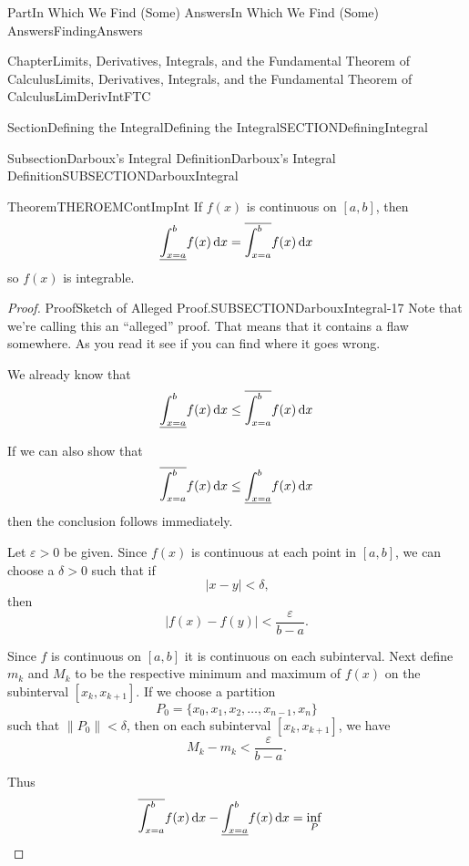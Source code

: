 \documentclass[oneside,10pt,]{book}
\numberwithin{equation}{part}
\newcommand{\norm}[1]{\left\|#1\right\|}
\newcommand{\dx}[1]{\,{\rm d}#1}
\newcommand{\eps}{\varepsilon}
\newcommand{\lt}{<}
\newcommand{\gt}{>}
\newcommand{\amp}{&}
\begin{document}
\begin{partptx}{Part}{In Which We Find (Some) Answers}{}{In Which We Find (Some) Answers}{}{}{FindingAnswers}
\begin{chapterptx}{Chapter}{Limits, Derivatives, Integrals, and the Fundamental Theorem of Calculus}{}{Limits, Derivatives, Integrals, and the Fundamental Theorem of Calculus}{}{}{LimDerivIntFTC}
\begin{sectionptx}{Section}{Defining the Integral}{}{Defining the Integral}{}{}{SECTIONDefiningIntegral}
\begin{subsectionptx}{Subsection}{Darboux's Integral Definition}{}{Darboux's Integral Definition}{}{}{SUBSECTIONDarbouxIntegral}
\begin{theorem}{Theorem}{}{}{THEROEMContImpInt}
If \(f\left(x\right)\) is continuous on \([a,b]\), then%
\begin{equation*}
\underline{\int^b_{x=a}}{f(x)}\dx{x}=\overline{\int^{b}_{x=a}}{f(x)\dx{x}}
\end{equation*}
so \(f(x)\) is integrable.%
\end{theorem}
\begin{proof}{Proof}{Sketch of Alleged Proof.}{SUBSECTIONDarbouxIntegral-17}
Note that we're calling this an ``alleged'' proof. That means that it contains a flaw somewhere. As you read it see if you can find where it goes wrong.%
\par
We already know that%
\begin{equation*}
\underline{\int^b_{x=a}}{f(x)}\dx{x}\le
\overline{\int^{b}_{x=a}}{f(x)\dx{x}}
\end{equation*}
%
\par
If we can also show that%
\begin{equation*}
\overline{\int^{b}_{x=a}}{f(x)\dx{x}}\le
\underline{\int^b_{x=a}}{f(x)}\dx{x}
\end{equation*}
then the conclusion follows immediately.%
\par
Let \(\eps \gt 0\) be given.  Since \(f\left(x\right)\) is continuous at each point in \([a,b]\), we can choose a \(\delta >0\) such that if%
\begin{equation}
\left|x-y\right|\lt \delta \text{,}\label{EQUATIONUniContFlaw1}
\end{equation}
then%
\begin{equation}
\left|f\left(x\right)-f\left(y\right)\right|\lt
\frac{\eps }{b-a} \text{.}\label{EQUATIONUniContFlaw2}
\end{equation}
%
\par
Since \(f\) is continuous on \([a,b]\) it is continuous on each subinterval.  Next define \(m_k\) and \(M_k\) to be the respective minimum and maximum of \(f(x)\) on the subinterval \([x_k, x_{k+1}]\).  If we choose a partition%
\begin{equation*}
P_0=\{x_0, x_1, x_2,\dots , x_{n-1}, x_n\}
\end{equation*}
such that \(\norm{P_0}\lt
\delta \), then on each subinterval \([x_k,
x_{k+1}]\), we have%
\begin{equation*}
M_k-m_k\lt \frac{\eps }{b-a}\text{.}
\end{equation*}
%
\par
Thus%
\begin{align*}
\overline{\int^{b}_{x=a}}{f(x)\dx{x}}-\underline{\int^b_{x=a}}{f(x)}\dx{x}\amp=\inf_{P}

\end{align*}
\end{proof}
\end{subsectionptx}
\end{sectionptx}
\end{chapterptx}
\end{partptx}
\end{document}
